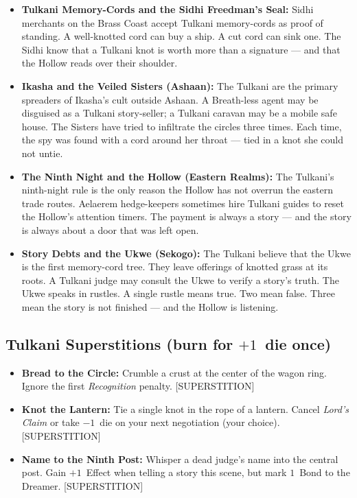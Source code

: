 \begin{itemize}
  \item \textbf{Tulkani Memory-Cords and the Sidhi Freedman's Seal:} Sidhi merchants on the Brass Coast accept Tulkani memory-cords as proof of standing. A well-knotted cord can buy a ship. A cut cord can sink one. The Sidhi know that a Tulkani knot is worth more than a signature --- and that the Hollow reads over their shoulder.
  \item \textbf{Ikasha and the Veiled Sisters (Ashaan):} The Tulkani are the primary spreaders of Ikasha's cult outside Ashaan. A Breath-less agent may be disguised as a Tulkani story-seller; a Tulkani caravan may be a mobile safe house. The Sisters have tried to infiltrate the circles three times. Each time, the spy was found with a cord around her throat --- tied in a knot she could not untie.
  \item \textbf{The Ninth Night and the Hollow (Eastern Realms):} The Tulkani's ninth-night rule is the only reason the Hollow has not overrun the eastern trade routes. Aelaerem hedge-keepers sometimes hire Tulkani guides to reset the Hollow's attention timers. The payment is always a story --- and the story is always about a door that was left open.
  \item \textbf{Story Debts and the Ukwe (Sekogo):} The Tulkani believe that the Ukwe is the first memory-cord tree. They leave offerings of knotted grass at its roots. A Tulkani judge may consult the Ukwe to verify a story's truth. The Ukwe speaks in rustles. A single rustle means true. Two mean false. Three mean the story is not finished --- and the Hollow is listening.
\end{itemize}

\subsection*{Tulkani Superstitions (burn for $+1$~die once)}
\begin{itemize}
  \item \textbf{Bread to the Circle:} Crumble a crust at the center of the wagon ring. Ignore the first \emph{Recognition} penalty. [SUPERSTITION]
  \item \textbf{Knot the Lantern:} Tie a single knot in the rope of a lantern. Cancel \emph{Lord's Claim} or take $-1$~die on your next negotiation (your choice). [SUPERSTITION]
  \item \textbf{Name to the Ninth Post:} Whisper a dead judge's name into the central post. Gain $+1$~Effect when telling a story this scene, but mark $1$~Bond to the Dreamer. [SUPERSTITION]
\end{itemize}

